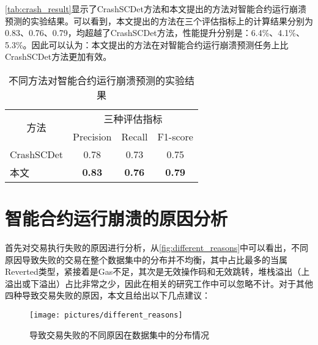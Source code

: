 \autoref{tab:crash_result}显示了CrashSCDet方法和本文提出的方法对智能合约运行崩溃预测的实验结果。可以看到，本文提出的方法在三个评估指标上的计算结果分别为0.83、0.76、0.79，均超越了CrashSCDet方法，性能提升分别是：6.4\%、4.1\%、5.3\%。因此可以认为：本文提出的方法在对智能合约运行崩溃预测任务上比CrashSCDet方法更加有效。
\begin{table}[htbp]
    \caption{\label{tab:crash_result}不同方法对智能合约运行崩溃预测的实验结果}
    \renewcommand{\arraystretch}{1.5}
    \begin{tabularx}{\linewidth}{X<{\centering}|X<{\centering}X<{\centering}X<{\centering}}
        \hline
    \multicolumn{1}{c|}{\multirow{2}{*}{方法}} & \multicolumn{3}{c}{三种评估指标}                                                                                \\ \cline{2-4} 
    \multicolumn{1}{c|}{}                    & Precision                         & Recall                            & F1-score                          \\ \hline
    CrashSCDet                               & \multicolumn{1}{c}{0.78} & \multicolumn{1}{c}{0.73} & \multicolumn{1}{c}{0.75} \\ 
    本文                                       & \multicolumn{1}{c}{\textbf{0.83}} & \multicolumn{1}{c}{\textbf{0.76}} & \multicolumn{1}{c}{\textbf{0.79}} \\ \hline
        \end{tabularx}
\end{table}
\section{智能合约运行崩溃的原因分析}
\label{sec:智能合约运行崩溃的原因分析}
首先对交易执行失败的原因进行分析，从\autoref{fig:different_reasons}中可以看出，不同原因导致失败的交易在整个数据集中的分布并不均衡，其中占比最多的当属Reverted类型，紧接着是Gas不足，其次是无效操作码和无效跳转，堆栈溢出（上溢出或下溢出）占比非常之少，因此在相关的研究工作中可以忽略不计。对于其他四种导致交易失败的原因，本文且给出以下几点建议：
\begin{figure}[htbp]
    \centering
    \texttt{[image: pictures/different\_reasons]}
    \caption{\label{fig:different_reasons}导致交易失败的不同原因在数据集中的分布情况}
\end{figure}

